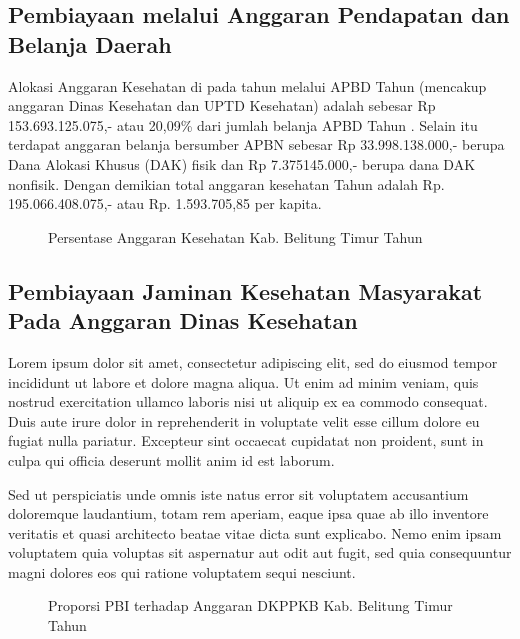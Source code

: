 \subsection{Pembiayaan melalui Anggaran Pendapatan dan Belanja Daerah}
Alokasi Anggaran Kesehatan di \namaKabupaten pada tahun
\tP melalui APBD \namaKabupaten Tahun \tP (mencakup anggaran
Dinas Kesehatan dan UPTD Kesehatan) adalah sebesar
Rp  153.693.125.075,- atau 20,09\% dari jumlah belanja APBD \namaKabupaten Tahun \tP. Selain itu terdapat anggaran belanja bersumber
APBN sebesar Rp 33.998.138.000,- berupa Dana Alokasi Khusus (DAK)
fisik dan  Rp 7.375145.000,- berupa dana DAK nonfisik. Dengan demikian total anggaran kesehatan \namaKabupaten
Tahun \tP adalah Rp. 195.066.408.075,- atau Rp. 1.593.705,85 per
kapita.

\begin{figure}[htb]
	\centering{}
	\caption{Persentase Anggaran Kesehatan Kab. Belitung Timur Tahun \tP}
	\label{fig:Anggaran-Kesehatan}
\end{figure}

\subsection{Pembiayaan Jaminan Kesehatan Masyarakat Pada Anggaran Dinas Kesehatan}
Lorem ipsum dolor sit amet, consectetur adipiscing elit, sed do eiusmod tempor incididunt ut labore et dolore magna aliqua. Ut enim ad minim veniam, quis nostrud exercitation ullamco laboris nisi ut aliquip ex ea commodo consequat. Duis aute irure dolor in reprehenderit in voluptate velit esse cillum dolore eu fugiat nulla pariatur. Excepteur sint occaecat cupidatat non proident, sunt in culpa qui officia deserunt mollit anim id est laborum.

Sed ut perspiciatis unde omnis iste natus error sit voluptatem accusantium doloremque laudantium, totam rem aperiam, eaque ipsa quae ab illo inventore veritatis et quasi architecto beatae vitae dicta sunt explicabo. Nemo enim ipsam voluptatem quia voluptas sit aspernatur aut odit aut fugit, sed quia consequuntur magni dolores eos qui ratione voluptatem sequi nesciunt.

\begin{figure}[htb]
	\centering{}
	\caption{Proporsi PBI terhadap Anggaran DKPPKB Kab. Belitung Timur Tahun \tP}
	\label{fig:Proporsi-PBI}
\end{figure}

